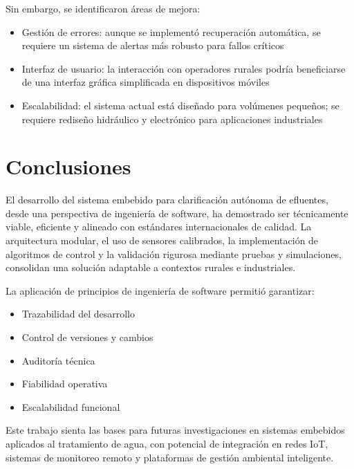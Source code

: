 \documentclass[conference]{IEEEtran}
\begin{document}
	Sin embargo, se identificaron áreas de mejora:
	
	\begin{itemize}
		\item Gestión de errores: aunque se implementó recuperación automática, se requiere un sistema de alertas más robusto para fallos críticos
		\item Interfaz de usuario: la interacción con operadores rurales podría beneficiarse de una interfaz gráfica simplificada en dispositivos móviles
		\item Escalabilidad: el sistema actual está diseñado para volúmenes pequeños; se requiere rediseño hidráulico y electrónico para aplicaciones industriales
	\end{itemize}
	
	\section{Conclusiones}
	
	El desarrollo del sistema embebido para clarificación autónoma de efluentes, desde una perspectiva de ingeniería de software, ha demostrado ser técnicamente viable, eficiente y alineado con estándares internacionales de calidad. La arquitectura modular, el uso de sensores calibrados, la implementación de algoritmos de control y la validación rigurosa mediante pruebas y simulaciones, consolidan una solución adaptable a contextos rurales e industriales.
	
	La aplicación de principios de ingeniería de software permitió garantizar:
	
	\begin{itemize}
		\item Trazabilidad del desarrollo
		\item Control de versiones y cambios
		\item Auditoría técnica
		\item Fiabilidad operativa
		\item Escalabilidad funcional
	\end{itemize}
	
	Este trabajo sienta las bases para futuras investigaciones en sistemas embebidos aplicados al tratamiento de agua, con potencial de integración en redes IoT, sistemas de monitoreo remoto y plataformas de gestión ambiental inteligente.
	
\end{document}
